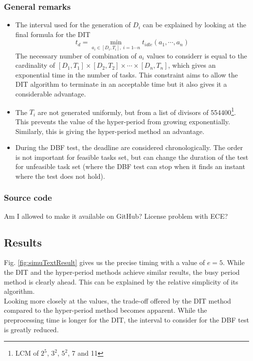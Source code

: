 \documentclass[a4paper,10pt]{article}
\begin{document}
\subsubsection{General remarks}
\label{sct:simuRemarks}
\begin{itemize}
	\item The interval used for the generation of $D_i$ can be explained by looking at the final formula for the DIT $$t_d = \operatorname*{min}_{a_i \in [D_i, T_i], \; i = 1 \cdots n} t_{idle} (a_1, \cdots, a_n)$$ The necessary number of combination of $a_i$ values to considerr is equal to the cardinality of $[D_1, T_1] \times [D_2, T_2] \times \cdots \times [D_n, T_n]$, which gives an exponential time in the number of tasks. This constraint aims to allow the DIT algorithm to terminate in an acceptable time but it also gives it a considerable advantage.
	\item The $T_i$ are not generated uniformly, but from a list of divisors of 554400\footnote{LCM of $2^5$, $3^2$, $5^2$, 7 and 11}. This prevents the value of the hyper-period from growing exponentially. Similarly, this is giving the hyper-period method an advantage.
	\item During the DBF test, the deadline are considered chronologically. The order is not important for feasible tasks set, but can change the duration of the test for unfeasible task set (where the DBF test can stop when it finds an instant where the test does not hold).
\end{itemize}

\subsubsection{Source code}

Am I allowed to make it available on GitHub? License problem with ECE?

\subsection{Results}

Fig. \ref{fig:simuTextResult} gives us the precise timing with a value of $e = 5$. While the DIT and the hyper-period methods achieve similar results, the busy period method is clearly ahead. This can be explained by the relative simplicity of its algorithm.\\

Looking more closely at the values, the trade-off offered by the DIT method compared to the hyper-period method becomes apparent. While the preprocessing time is longer for the DIT, the interval to consider for the DBF test is greatly reduced.\\
\end{document}
